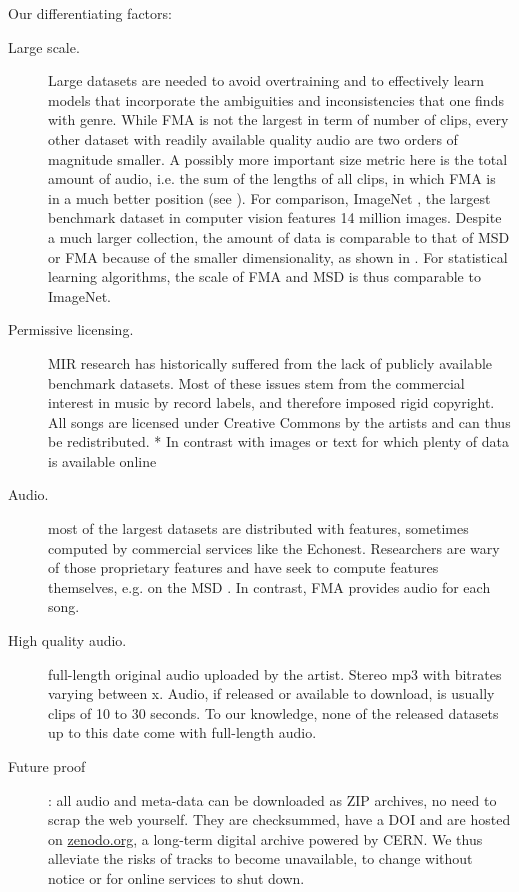 \documentclass{article}
\begin{document}

Our differentiating factors:
\begin{description}
	\item[Large scale.] Large datasets are needed to avoid overtraining and to effectively learn models that incorporate the ambiguities and inconsistencies that one finds with genre. While FMA is not the largest in term of number of clips, every other dataset with readily available quality audio are two orders of magnitude smaller. A possibly more important size metric here is the total amount of audio, i.e. the sum of the lengths of all clips, in which FMA is in a much better position (see ). For comparison, ImageNet \cite{imagenet}, the largest benchmark dataset in computer vision features 14 million images. Despite a much larger collection, the amount of data is comparable to that of MSD or FMA because of the smaller dimensionality, as shown in . For statistical learning algorithms, the scale of FMA and MSD is thus comparable to ImageNet.
	\item[Permissive licensing.] MIR research has historically suffered from the lack of publicly available benchmark datasets. Most of these issues stem from the commercial interest in music by record labels, and therefore imposed rigid copyright. All songs are licensed under Creative Commons by the artists and can thus be redistributed.
* In contrast with images or text for which plenty of data is available online
	\item[Audio.] most of the largest datasets are distributed with features, sometimes computed by commercial services like the Echonest. Researchers are wary of those proprietary features and have seek to compute features themselves, e.g. on the MSD \cite{msd_features}. In contrast, FMA provides audio for each song.
	\item[High quality audio.] full-length original audio uploaded by the artist. Stereo mp3 with bitrates varying between x. Audio, if released or available to download, is usually clips of 10 to 30 seconds. To our knowledge, none of the released datasets up to this date come with full-length audio.
	\item[Future proof]: all audio and meta-data can be downloaded as ZIP archives, no need to scrap the web yourself. They are checksummed, have a DOI and are hosted on \href{https://zenodo.org}{zenodo.org}, a long-term digital archive powered by CERN. We thus alleviate the risks of tracks to become unavailable, to change without notice or for online services to shut down.

\end{description}
\end{document}
